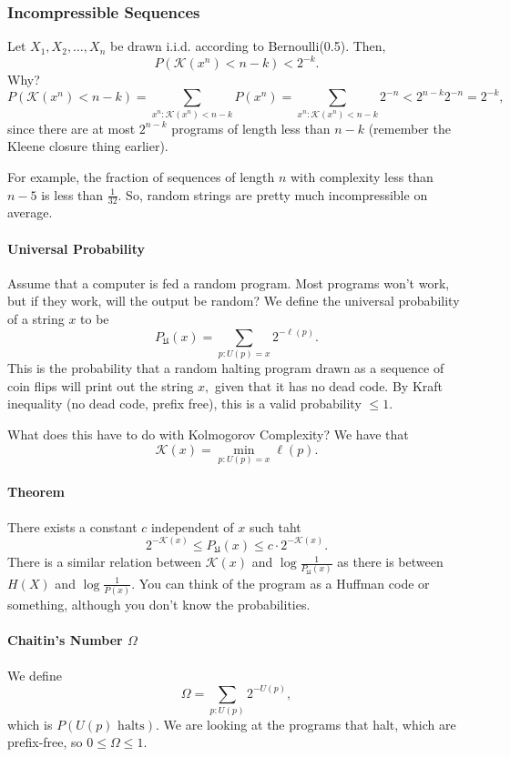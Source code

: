 \documentclass[12pt]{article}
\theoremstyle{remark}
\begin{document}
\subsubsection{Incompressible Sequences}
Let $X_1,X_2,\dots,X_n$ be drawn i.i.d. according to Bernoulli(0.5). Then,
\[P(\mathcal{K}(x^n)<n-k)<2^{-k}.\]
Why?
\[P(\mathcal{K}(x^n)<n-k)=\sum_{x^n:\mathcal{K}(x^n)<n-k} P(x^n)=\sum_{x^n:\mathcal{K}(x^n)<n-k}2^{-n}<2^{n-k}2^{-n}=2^{-k},\] since there are at most $2^{n-k}$ programs of length less than $n-k$ (remember the Kleene closure thing earlier).

For example, the fraction of sequences of length $n$ with complexity less than $n-5$ is less than $\frac{1}{32}.$ So, random strings are pretty much incompressible on average. 

\paragraph{Universal Probability}
Assume that a computer is fed a random program. Most programs won't work, but if they work, will the output be random? We define the universal probability of a string $x$ to be
\[P_\mathfrak{U}(x)=\sum_{p:U(p)=x}2^{-\ell(p)}.\]
This is the probability that a random halting program drawn as a sequence of coin flips will print out the string $x,$ given that it has no dead code. By Kraft inequality (no dead code, prefix free), this is a valid probability $\le 1$.

What does this have to do with Kolmogorov Complexity? We have that \[\mathcal{K}(x)=\min_{p:U(p)=x}\ell(p).\]
\paragraph{Theorem}
There exists a constant $c$ independent of $x$ such taht
\[
2^{-\mathcal{K}(x)}\le P_{\mathfrak{U}}(x)\le c\cdot2^{-\mathcal{K}(x)}.
\]
There is a similar relation between $\mathcal{K}(x)$ and $\log\frac{1}{P_{\mathfrak{U}}(x)}$ as there is between $H(X)$ and $\log\frac{1}{P(x)}.$
You can think of the program as a Huffman code or something, although you don't know the probabilities.

\paragraph{Chaitin's Number $\Omega$}
We define
\[\Omega=\sum_{p:U(p)}2^{-U(p)},\] which is $P(U(p)\text{ halts}).$ We are looking at the programs that halt, which are prefix-free, so $0\le\Omega\le 1.$
\end{document}
